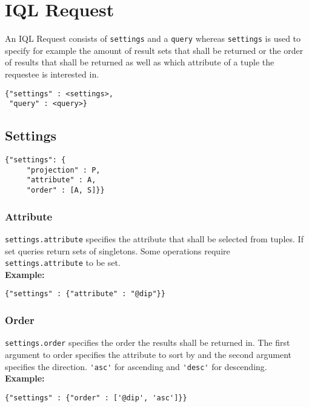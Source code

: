 \documentclass[a4paper]{article}
\begin{document}
\section{IQL Request}

An IQL Request consists of \verb|settings| and a \verb|query| whereas
\verb|settings| is used to specify for example the amount of result
sets that shall be returned or the order of results that shall be
returned as well as which attribute of a tuple the requestee is
interested in.

\begin{verbatim}
{"settings" : <settings>,
 "query" : <query>}
\end{verbatim}

\subsection{Settings}

\begin{verbatim}
{"settings": {
     "projection" : P,
     "attribute" : A,
     "order" : [A, S]}}
\end{verbatim}

\subsubsection{Attribute}

\verb|settings.attribute| specifies the attribute that shall be selected from tuples. If set queries return sets of singletons. Some operations require \verb|settings.attribute| to be set. \\

\textbf{Example:}
\begin{verbatim}
{"settings" : {"attribute" : "@dip"}}
\end{verbatim}

\subsubsection{Order}

\verb|settings.order| specifies the order the results shall be
returned in. The first argument to order specifies the attribute to
sort by and the second argument specifies the direction.
\verb|'asc'| for ascending and \verb|'desc'| for descending.\\

\textbf{Example:}
\begin{verbatim}
{"settings" : {"order" : ['@dip', 'asc']}}
\end{verbatim}
\end{document}
